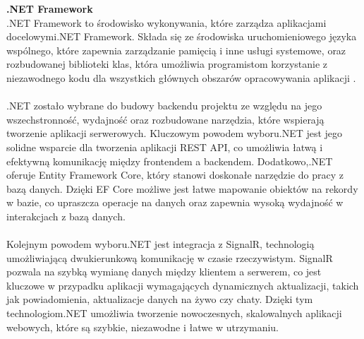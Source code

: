 \documentclass[twoside]{projektInzynierskiMS1}
\begin{document}
\noindent \textbf{.NET Framework}\\
.NET Framework to środowisko wykonywania, które zarządza aplikacjami docelowymi.NET Framework. Składa się ze środowiska uruchomieniowego języka wspólnego, które zapewnia zarządzanie pamięcią i inne usługi systemowe, oraz rozbudowanej biblioteki klas, która umożliwia programistom korzystanie z niezawodnego kodu dla wszystkich głównych obszarów opracowywania aplikacji \cite{DotNetStart}.
\\\\
.NET zostało wybrane do budowy backendu projektu ze względu na jego wszechstronność, wydajność oraz rozbudowane narzędzia, które wspierają tworzenie aplikacji serwerowych. Kluczowym powodem wyboru.NET jest jego solidne wsparcie dla tworzenia aplikacji REST API, co umożliwia łatwą i efektywną komunikację między frontendem a backendem. Dodatkowo,.NET oferuje Entity Framework Core, który stanowi doskonałe narzędzie do pracy z bazą danych. Dzięki EF Core możliwe jest łatwe mapowanie obiektów na rekordy w bazie, co upraszcza operacje na danych oraz zapewnia wysoką wydajność w interakcjach z bazą danych.
\\\\
Kolejnym powodem wyboru.NET jest integracja z SignalR, technologią umożliwiającą dwukierunkową komunikację w czasie rzeczywistym. SignalR pozwala na szybką wymianę danych między klientem a serwerem, co jest kluczowe w przypadku aplikacji wymagających dynamicznych aktualizacji, takich jak powiadomienia, aktualizacje danych na żywo czy chaty. Dzięki tym technologiom.NET umożliwia tworzenie nowoczesnych, skalowalnych aplikacji webowych, które są szybkie, niezawodne i łatwe w utrzymaniu.
\\
\end{document}

